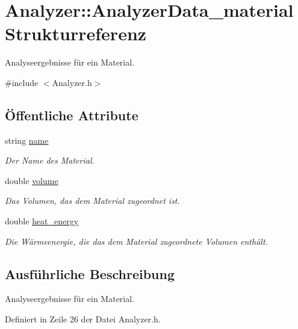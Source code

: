 \hypertarget{structAnalyzer_1_1AnalyzerData__material}{\section{Analyzer\-:\-:Analyzer\-Data\-\_\-material Strukturreferenz}
\label{structAnalyzer_1_1AnalyzerData__material}
}


Analyseergebnisse für ein Material.  




{\ttfamily \#include $<$Analyzer.\-h$>$}

\subsection*{Öffentliche Attribute}
\begin{DoxyCompactItemize}
\item 
string \hyperlink{structAnalyzer_1_1AnalyzerData__material_a0a6b01fc900ce677ae8403d3a85b829b}{name}
\begin{DoxyCompactList}\small\item\em Der Name des Material. \end{DoxyCompactList}\item 
double \hyperlink{structAnalyzer_1_1AnalyzerData__material_a20017730ff899b65f91aa30caaf35dd6}{volume}
\begin{DoxyCompactList}\small\item\em Das Volumen, das dem Material zugeordnet ist. \end{DoxyCompactList}\item 
double \hyperlink{structAnalyzer_1_1AnalyzerData__material_a94efc7f38f7f59c97a48a0155f9c4719}{heat\-\_\-energy}
\begin{DoxyCompactList}\small\item\em Die Wärmeenergie, die das dem Material zugeordnete Volumen enthält. \end{DoxyCompactList}\end{DoxyCompactItemize}


\subsection{Ausführliche Beschreibung}
Analyseergebnisse für ein Material. 

Definiert in Zeile 26 der Datei Analyzer.\-h.



